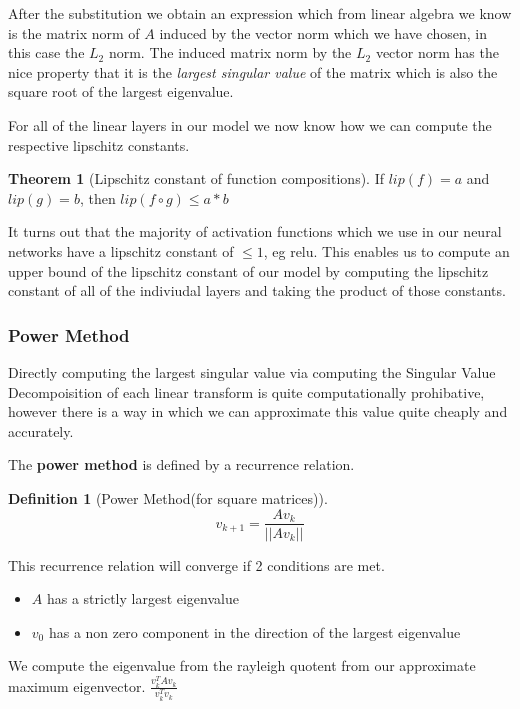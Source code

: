 \documentclass[12pt, a4paper]{report}
\theoremstyle{definition}
\newtheorem{definition}{Definition}[section]
\newtheorem{theorem}{Theorem}
\begin{document}
After the substitution we obtain an expression which from linear algebra we know is the matrix norm of $A$ induced by the vector norm which we have chosen, in this case the $L_2$ norm. The induced matrix norm by the $L_2$ vector norm has the nice property that it is the \textit{largest singular value} of the matrix which is also the square root of the largest eigenvalue.

For all of the linear layers in our model we now know how we can compute the respective lipschitz constants.

\begin{theorem}[Lipschitz constant of function compositions]
    If $lip(f) = a$ and $lip(g) = b$, then $lip(f \circ g) \leq a * b$
\end{theorem}

It turns out that the majority of activation functions which we use in our neural networks have a lipschitz constant of $\leq 1$, eg relu. This enables us to compute an upper bound of the lipschitz constant of our model by computing the lipschitz constant of all of the indiviudal layers and taking the product of those constants.



\subsubsection{Power Method}

Directly computing the largest singular value via computing the Singular Value Decompoisition of each linear transform is quite computationally prohibative, however there is a way in which we can approximate this value quite cheaply and accurately.

The \textbf{power method} is defined by a recurrence relation.

\begin{definition}[Power Method(for square matrices)]
    $$v_{k+1} = \frac{Av_k}{||Av_k||} $$
\end{definition}

This recurrence relation will converge if 2 conditions are met.

\begin{itemize}
    \item $A$ has a strictly largest eigenvalue
    \item $v_0$ has a non zero component in the direction of the largest eigenvalue
\end{itemize}

We compute the eigenvalue from the rayleigh quotent from our approximate maximum eigenvector. $\frac{v_k^T A v_k}{v_k ^ T v_k}$
\end{document}
